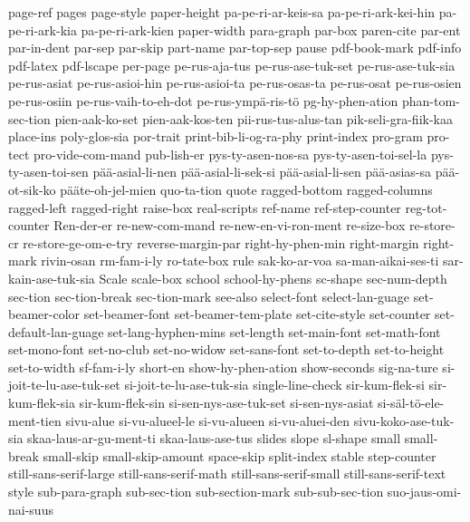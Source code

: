 {  page-ref
  pages
  page-style
  paper-height
  pa-pe-ri-ar-keis-sa
  pa-pe-ri-ark-kei-hin
  pa-pe-ri-ark-kia
  pa-pe-ri-ark-kien
  paper-width
  para-graph
  par-box
  paren-cite
  par-ent
  par-in-dent
  par-sep
  par-skip
  part-name
  par-top-sep
  pause
  pdf-book-mark
  pdf-info
  pdf-latex
  pdf-lscape
  per-page
  pe-rus-aja-tus
  pe-rus-ase-tuk-set
  pe-rus-ase-tuk-sia
  pe-rus-asiat
  pe-rus-asioi-hin
  pe-rus-asioi-ta
  pe-rus-osas-ta
  pe-rus-osat
  pe-rus-osien
  pe-rus-osiin
  pe-rus-vaih-to-eh-dot
  pe-rus-ympä-ris-tö
  pg-hy-phen-ation
  phan-tom-sec-tion
  pien-aak-ko-set
  pien-aak-kos-ten
  pii-rus-tus-alus-tan
  pik-seli-gra-fiik-kaa
  place-ins
  poly-glos-sia
  por-trait
  print-bib-li-og-ra-phy
  print-index
  pro-gram
  pro-tect
  pro-vide-com-mand
  pub-lish-er
  pys-ty-asen-nos-sa
  pys-ty-asen-toi-sel-la
  pys-ty-asen-toi-sen
  pää-asial-li-nen
  pää-asial-li-sek-si
  pää-asial-li-sen
  pää-asias-sa
  pää-ot-sik-ko
  pääte-oh-jel-mien
  quo-ta-tion
  quote
  ragged-bottom
  ragged-columns
  ragged-left
  ragged-right
  raise-box
  real-scripts
  ref-name
  ref-step-counter
  reg-tot-counter
  Ren-der-er
  re-new-com-mand
  re-new-en-vi-ron-ment
  re-size-box
  re-store-cr
  re-store-ge-om-e-try
  reverse-margin-par
  right-hy-phen-min
  right-margin
  right-mark
  rivin-osan
  rm-fam-i-ly
  ro-tate-box
  rule
  sak-ko-ar-voa
  sa-man-aikai-ses-ti
  sar-kain-ase-tuk-sia
  Scale
  scale-box
  school
  school-hy-phens
  sc-shape
  sec-num-depth
  sec-tion
  sec-tion-break
  sec-tion-mark
  see-also
  select-font
  select-lan-guage
  set-beamer-color
  set-beamer-font
  set-beamer-tem-plate
  set-cite-style
  set-counter
  set-default-lan-guage
  set-lang-hyphen-mins
  set-length
  set-main-font
  set-math-font
  set-mono-font
  set-no-club
  set-no-widow
  set-sans-font
  set-to-depth
  set-to-height
  set-to-width
  sf-fam-i-ly
  short-en
  show-hy-phen-ation
  show-seconds
  sig-na-ture
  si-joit-te-lu-ase-tuk-set
  si-joit-te-lu-ase-tuk-sia
  single-line-check
  sir-kum-flek-si
  sir-kum-flek-sia
  sir-kum-flek-sin
  si-sen-nys-ase-tuk-set
  si-sen-nys-asiat
  si-säl-tö-ele-ment-tien
  sivu-alue
  si-vu-alueel-le
  si-vu-alueen
  si-vu-aluei-den
  sivu-koko-ase-tuk-sia
  skaa-laus-ar-gu-ment-ti
  skaa-laus-ase-tus
  slides
  slope
  sl-shape
  small
  small-break
  small-skip
  small-skip-amount
  space-skip
  split-index
  stable
  step-counter
  still-sans-serif-large
  still-sans-serif-math
  still-sans-serif-small
  still-sans-serif-text
  style
  sub-para-graph
  sub-sec-tion
  sub-section-mark
  sub-sub-sec-tion
  suo-jaus-omi-nai-suus
}
